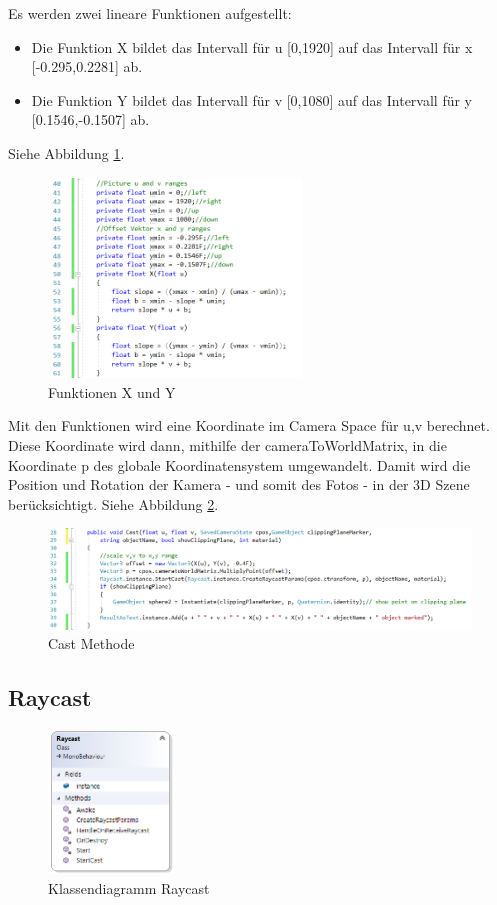 \documentclass[german,a4paper, 12pt]{llncs}
\begin{document}
Es werden zwei lineare Funktionen aufgestellt:
\begin{itemize}
	\item Die Funktion X bildet das Intervall für u [0,1920] auf das Intervall für x [-0.295,0.2281] ab.
	\item Die Funktion Y bildet das Intervall für v [0,1080] auf das Intervall für y [0.1546,-0.1507] ab.
\end{itemize}
Siehe Abbildung \ref{code:uvtoxy}.
\begin{figure}[H]
	\centering
	\includegraphics[width=0.6\textwidth]{images/code_uv_to_xy_scale.PNG}
	\caption[]{Funktionen X und Y}
	\label{code:uvtoxy}
\end{figure}

Mit den Funktionen wird eine Koordinate im Camera Space für u,v berechnet. Diese Koordinate wird dann, mithilfe der cameraToWorldMatrix, in die Koordinate p des globale Koordinatensystem umgewandelt. Damit wird die Position und Rotation der Kamera - und somit des Fotos - in der 3D Szene berücksichtigt. Siehe Abbildung \ref{code:castmethod}.

\begin{figure}[H]
	\centering
	\includegraphics[width=1.2\textwidth]{images/code_cast_method.PNG}
	\caption[]{Cast Methode}
	\label{code:castmethod}
\end{figure}
\subsection{Raycast}

\begin{figure}[H]
	\centering
	\includegraphics[width=0.3\textwidth]{images/dia_raycast.PNG}
	\caption[]{Klassendiagramm Raycast}
	\label{dia:raycast}
\end{figure}
\end{document}
